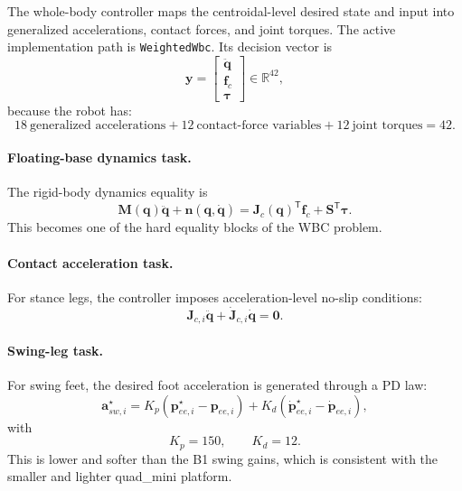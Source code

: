 \documentclass[11pt,a4paper]{article}
\newcommand{\R}{\mathbb{R}}
\newcommand{\vect}[1]{\boldsymbol{#1}}
\newcommand{\mat}[1]{\mathbf{#1}}
\newcommand{\trans}{^{\mathsf T}}
\newcommand{\code}[1]{\texttt{#1}}
\begin{document}
The whole-body controller maps the centroidal-level desired state and input into generalized accelerations, contact forces, and joint
torques. The active implementation path is \code{WeightedWbc}. Its decision vector is
\begin{equation}
\vect{y} =
\begin{bmatrix}
\ddot{\vect{q}} \\
\vect{f}_c \\
\vect{\tau}
\end{bmatrix}
\in \R^{42},
\end{equation}
because the robot has:
\begin{equation}
18\ \text{generalized accelerations} +
12\ \text{contact-force variables} +
12\ \text{joint torques} = 42.
\end{equation}

\paragraph{Floating-base dynamics task.}
The rigid-body dynamics equality is
\begin{equation}
\mat{M}(\vect{q})\ddot{\vect{q}} + \vect{n}(\vect{q},\dot{\vect{q}})
= \mat{J}_c(\vect{q})\trans \vect{f}_c + \mat{S}\trans \vect{\tau}.
\end{equation}
This becomes one of the hard equality blocks of the WBC problem.

\paragraph{Contact acceleration task.}
For stance legs, the controller imposes acceleration-level no-slip conditions:
\begin{equation}
\mat{J}_{c,i}\ddot{\vect{q}} + \dot{\mat{J}}_{c,i}\dot{\vect{q}} = \vect{0}.
\end{equation}

\paragraph{Swing-leg task.}
For swing feet, the desired foot acceleration is generated through a PD law:
\begin{equation}
\vect{a}_{sw,i}^{\star}
= K_p\left(\vect{p}_{ee,i}^{\star} - \vect{p}_{ee,i}\right)
+ K_d\left(\dot{\vect{p}}_{ee,i}^{\star} - \dot{\vect{p}}_{ee,i}\right),
\end{equation}
with
\begin{equation}
K_p = 150, \qquad K_d = 12.
\end{equation}
This is lower and softer than the B1 swing gains, which is consistent with the smaller and lighter quad\_mini platform.
\end{document}
